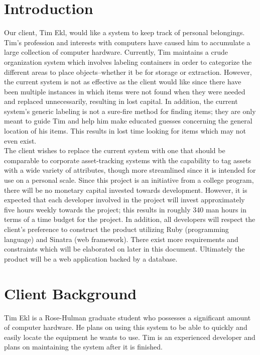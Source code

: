 \documentclass{article}
\begin{document}
\section{Introduction}
Our client, Tim Ekl, would like a system to keep track of personal belongings. Tim's profession and interests with computers have caused him to accumulate a large collection of computer hardware. Currently, Tim maintains a crude organization system which involves labeling containers in order to categorize the different areas to place objects--whether it be for storage or extraction. However, the current system is not as effective as the client would like since there have been multiple instances in which items were not found when they were needed and replaced unnecessarily, resulting in lost capital. In addition, the current system's generic labeling is not a sure-fire method for finding items; they are only meant to guide Tim and help him make educated guesses concerning the general location of his items. This results in lost time looking for items which may not even exist.\\
The client wishes to replace the current system with one that should be comparable to corporate asset-tracking systems with the capability to tag assets with a wide variety of attributes, though more streamlined since it is intended for use on a personal scale. Since this project is an initiative from a college program, there will be no monetary capital invested towards development. However, it is expected that each developer involved in the project will invest approximately five hours weekly towards the project; this results in roughly 340 man hours in terms of a time budget for the project. In addition, all developers will respect the client's preference to construct the product utilizing Ruby (programming language) and Sinatra (web framework). There exist more requirements and constraints which will be elaborated on later in this document. Ultimately the product will be a web application backed by a database.

\section{Client Background}
Tim Ekl is a Rose-Hulman graduate student who possesses a significant amount of computer hardware.  He plans on using this system to be able to quickly and easily locate the equipment he wants to use.  Tim is an experienced developer and plans on maintaining the system after it is finished.  
\end{document}
